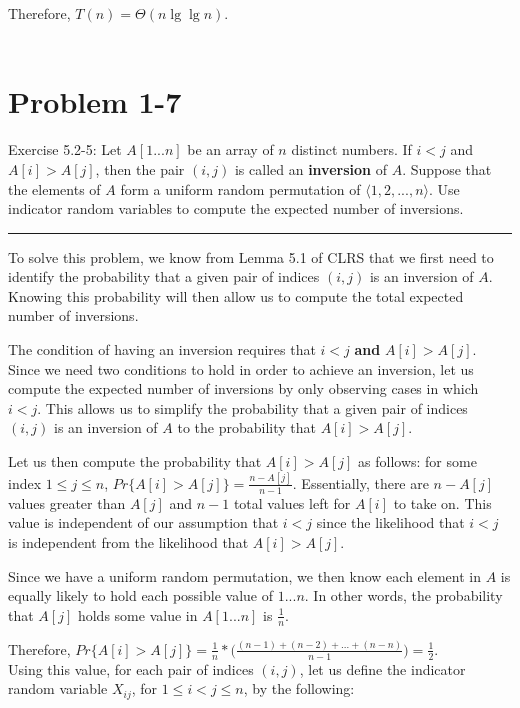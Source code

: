 \documentclass[11pt]{article}
\def\separateline{\medskip\hrule\medskip}
\begin{document}
Therefore, $T(n) = \Theta(n\lg{\lg{n}})$.\\\\

 \newpage

 \section{Problem 1-7}
 Exercise 5.2-5: Let $A[1...n]$ be an array of $n$ distinct numbers. If $i < j$ and $A[i] > A[j]$, then the pair $(i,j)$ is called an \textbf{inversion} of $A$. Suppose that the elements of $A$ form a uniform random permutation of $\langle1,2,...,n\rangle$. Use indicator random variables to compute the expected number of inversions.
 \separateline

 To solve this problem, we know from Lemma 5.1 of CLRS that we first need to identify the probability that a given pair of indices $(i,j)$ is an inversion of $A$. Knowing this probability will then allow us to compute the total expected number of inversions.

 The condition of having an inversion requires that $i < j$ \textbf{and} $A[i] > A[j]$. Since we need two conditions to hold in order to achieve an inversion, let us compute the expected number of inversions by only observing cases in which $i < j$. This allows us to simplify the probability that a given pair of indices $(i,j)$ is an inversion of $A$ to the probability that $A[i] > A[j]$.

 Let us then compute the probability that $A[i] > A[j]$ as follows: for some index $1 \leq j \leq n$, $Pr\{A[i] > A[j]\} = \frac{n - A[j]}{n - 1}$. Essentially, there are $n - A[j]$ values greater than $A[j]$ and $n-1$ total values left for $A[i]$ to take on. This value is independent of our assumption that $i < j$ since the likelihood that $i < j$ is independent from the likelihood that $A[i] > A[j]$.

 Since we have a uniform random permutation, we then know each element in $A$ is equally likely to hold each possible value of $1...n$. In other words, the probability that $A[j]$ holds some value in $A[1...n]$ is $\frac{1}{n}$.

 Therefore, $Pr\{A[i] > A[j]\} = \frac{1}{n} * \Big( \frac{(n-1) + (n-2) + ... + (n-n)}{n - 1}\Big) = \frac{1}{2}$.\\

 Using this value, for each pair of indices $(i,j)$, let us define the indicator random variable $X_{ij}$, for $1 \leq i < j \leq n$, by the following:
\end{document}
